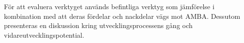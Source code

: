 För att evaluera verktyget används befintliga verktyg som jämförelse i
kombination med att deras fördelar och nackdelar vägs mot AMBA. Dessutom
presenteras en diskussion kring utvecklingsprocessens gång och
vidareutvecklingspotential.
